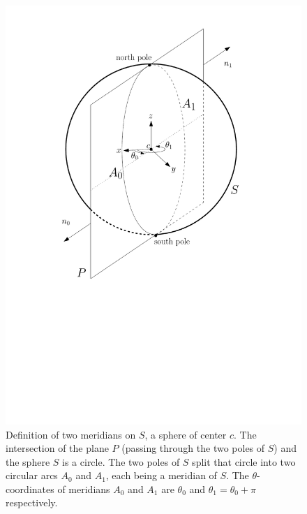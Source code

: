 \begin{ccTexOnly}
\begin{figure}[ht!]
\centerline{
 \includegraphics[height=.5\textwidth]{Circular_kernel_3/def_meridian}
}
\caption{Definition of two meridians on $S$, a sphere of center $c$.
The intersection of the plane $P$ (passing through the two poles of $S$)
and the sphere $S$ is a circle. The two poles of $S$ split that circle into two circular arcs $A_0$ and $A_1$, each being a meridian of $S$. 
The $\theta$-coordinates of meridians $A_0$ and $A_1$ are $\theta_0$ and $\theta_1= \theta_0 + \pi$ respectively.
\label{fig-def-meridian}}
\end{figure}
\end{ccTexOnly}

